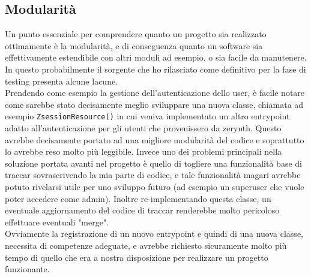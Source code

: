 \documentclass[a4paper,titlepage,12pt]{book}
\begin{document}
{\subsection{
Modularità}
Un punto essenziale per comprendere quanto un progetto sia realizzato ottimamente è la modularità, e di conseguenza quanto un software sia effettivamente estendibile con altri moduli ad esempio, o sia facile da manutenere. In questo probabilmente il sorgente che ho rilasciato come definitivo per la fase di testing presenta alcune lacune.\\
Prendendo come esempio la gestione dell'autenticazione dello user, è facile notare come sarebbe stato decisamente meglio sviluppare una nuova classe, chiamata ad esempio \texttt{ZsessionResource()} in cui veniva implementato un altro entrypoint adatto all'autenticazione per gli utenti che provenissero da zerynth.  Questo avrebbe decisamente portato ad una migliore modularità del codice e soprattutto lo avrebbe reso molto più leggibile. Invece uno dei problemi principali nella soluzione portata avanti nel progetto è quello di togliere una funzionalità base di traccar sovrascrivendo la mia parte di codice, e tale funzionalità magari avrebbe potuto rivelarsi utile per uno sviluppo futuro (ad esempio un superuser che vuole poter accedere come admin). Inoltre re-implementando questa classe, un eventuale aggiornamento del codice di traccar renderebbe molto pericoloso effettuare eventuali "merge".\\
Ovviamente la registrazione di un nuovo entrypoint e quindi di una nuova classe, necessita di competenze adeguate, e avrebbe richiesto sicuramente molto più tempo di quello che era a nostra disposizione per realizzare un progetto funzionante.

}
\end{document}
